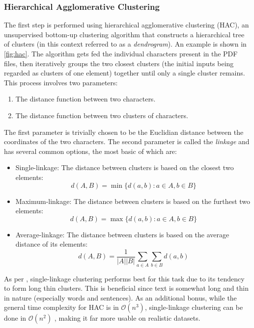 \subsubsection{Hierarchical Agglomerative Clustering}
The first step is performed using hierarchical agglomerative clustering (HAC),
an unsupervised bottom-up clustering algorithm that constructs a hierarchical
tree of clusters (in this context referred to as a \emph{dendrogram}). An
example is shown in \cref{fig:hac}. The algorithm gets fed the individual
characters present in the PDF files, then iteratively groups the two closest
clusters (the initial inputs being regarded as clusters of one element) together
until only a single cluster remains. This process involves two parameters:
\begin{enumerate}
\item The distance function between two characters.
\item The distance function between two clusters of characters.
\end{enumerate}
The first parameter is trivially chosen to be the Euclidian distance between the
coordinates of the two characters. The second parameter is called the
\emph{linkage} and has several common options, the most basic of which are:
\begin{itemize}
\item Single-linkage: The distance between clusters is based on the closest two
  elements: \[ d(A, B) = \min \{ d(a, b) : a \in A, b \in B \} \]
\item Maximum-linkage: The distance between clusters is based on the furthest two
  elements: \[ d(A, B) = \max \{ d(a, b) : a \in A, b \in B \} \]
\item Average-linkage: The distance between clusters is based on the average
  distance of its elements:
  \[ d(A, B) = \frac{1}{|A||B|} \sum_{a \in A}\sum_{b \in B} d(a, b) \]
\end{itemize}
As per \textcite{klampfl2014unsupervised}, single-linkage clustering performs
best for this task due to its tendency to form long thin clusters. This is
beneficial since text is somewhat long and thin in nature (especially words and
sentences). As an additional bonus, while the general time complexity for HAC is
in $\mathcal{O}(n^3)$, single-linkage clustering can be done in
$\mathcal{O}(n^2)$ \citep{sibson1973slink}, making it far more usable on
realistic datasets.

